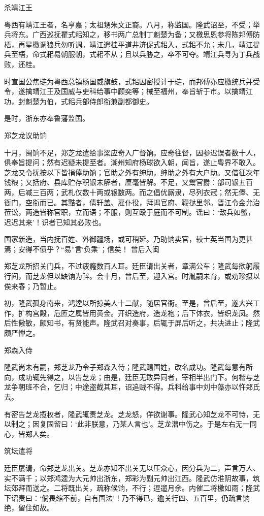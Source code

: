 \documentclass[]{article}
\begin{document}
杀靖江王

粤西有靖江王者，名亨嘉；太祖甥朱文正裔。八月，称监国。隆武诏至，不受；举兵将东。广西巡抚瞿式耜知之，移书两广总制丁魁楚为备；又檄思恩参将陈邦傅防梧，再星檄调狼兵勿听调。靖江遣桂平道井济促式耜入，式耜不允；未几，靖江提兵至梧，命式耜易朝服朝，式耜不从；且以兵胁之，卒不可夺。靖江兵寻为丁兵战败，还桂。

时宣国公焦琏为粤西总镇杨国威旗鼓，式耜因密授计于琏，而邦傅亦应檄统兵并受令，遂擒靖江王及国威与吏科给事中顾奕等；械至福州，奉旨斩于市。以擒靖江功，封魁楚为伯，式耜兵部侍郎衔兼副都御史。

是时，浙东亦奉鲁藩监国。

郑芝龙议助饷

十月，闽饷不足，郑芝龙遣给事梁应奇入广督饷。应奇往督，因参迟误者数十人，俱奉旨提问；然有迟疑未提至者。潮州知府杨球欲入朝，闻旨，遂止粤界不敢入。芝龙又令抚按以下皆捐俸助饷；官助之外有绅助，绅助之外有大户助。又借征次年钱粮；又括府、县库贮存积银未解者，厘毫皆解。不足，又鬻官爵：部司银五百两，后减三百两；武札仅数十两或银数两。而之倡优厮隶，尽列衣冠；然无俸、无衙门，空衔而已。其黠者，倩轩盖、雇仆役，拜谒官府、鞭挞里邻。晋江令金允治莅讼，两造皆称官职，立而语；不服，则互殴于庭而不可制。谣曰：`敌兵如蟹，迟迟其来'！识者已知其必败也。

国家新造，当内抚百姓、外御疆场，或可稍延。乃助饷卖官，较士英当国为更甚焉；安得不偾乎？``易''言`负乘'；信矣！
曾后入闽

郑芝龙所招关门兵，不过疲癃数百人耳。廷臣请出关者，章满公车；隆武每欲躬履行间，而芝龙但以缺饷为辞。会十月，曾后至，迎入宫。时胤嗣未育，或劝珍摄以俟来春；乃暂止。

初，隆武孤身南来，鸿逵以所掠美人十二献，随居官衙。至是，曾后至，遂大兴工作，扩构宫殿，卮匜之属皆用黄金。开织造府，造龙袍；后下体衣，皆织龙凤。然后性儆敏，颇知书，有贤能声。隆武召对奏事，后辄于屏后听之，共决进止；隆武颇严惮之。

郑森入侍

隆武尚未有嗣，郑芝龙乃令子郑森入侍；隆武赐国姓，改名成功。隆武每意有所向，成功辄先得之，以告芝龙；由是，廷臣无敢异同者，宰相半出门下。何楷与芝龙争朝班不合，乞归；中途盗截其耳，诏追贼不得。兵科给事中刘中藻亦以忤郑氏去。

有密告芝龙揽权者，隆武辄责芝龙。芝龙怒，佯欲谢事。隆武心知芝龙不可恃，无以制之；因复固留曰：`此非朕意，乃某人言也'。芝龙潜中伤之。于是左右无一同心，皆郑人矣。

筑坛遣将

廷臣屡请，命郑芝龙出关。芝龙亦知不出关无以压众心，因分兵为二，声言万人、实不满千；以郑鸿逵为大元帅出浙东，郑彩为副元帅出江西。隆武仿淮阴故事，筑坛郊拜而送之。二将既出关，疏称候饷，不行；逗遛月余。内催二将檄如雨；隆武下诏责曰：`倘畏缩不前，自有国法'！乃不得已，逾关行四、五百里，仍疏言饷绝，留住如故。
\end{document}
